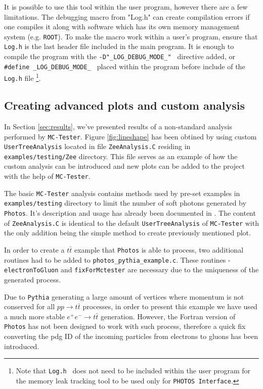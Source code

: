 \documentclass[]{Photos_interface_design}
\begin{document}
It is possible to use this tool within the user program, however there are a few limitations.
The debugging macro from "Log.h" can create compilation errors if one compiles
it along with software which has its own memory management system (e.g. {\tt ROOT}).
To make the macro work within a user's program, ensure that {\tt Log.h} is the last header file
included in the main program.
It is enough to  compile the program with the {\tt -D"\_LOG\_DEBUG\_MODE\_" } directive added,
or {\tt \#define \_LOG\_DEBUG\_MODE\_ } placed within the program before include
of the {\tt Log.h} file%
\footnote{Note that {\tt Log.h } does not need to be included within
the user program  for the memory leak tracking tool to be used only for {\tt PHOTOS Interface}.
}.

\subsection{Creating advanced plots and custom analysis}
\label{App:Plots}

In Section \ref{sec:results}, we've presented results of a non-standard
analysis performed by {\tt MC-Tester}. Figure \ref{fig:lineshape} has been
obtined by using custom {\tt UserTreeAnalysis} located in file {\tt ZeeAnalysis.C}
residing in {\tt examples/testing/Zee} directory. This file serves as an
example of how the custom analysis can be introduced and new plots can be
added to the project with the help of {\tt MC-Tester}.

The basic {\tt MC-Tester} analysis contains methods used by pre-set examples
in {\tt examples/testing} directory to limit the number of soft photons generated
by {\tt Photos}. It's description and usage has already been documented in \cite{??}.
The content of {\tt ZeeAnalysis.C} is identical to the default {\tt UserTreeAnalysis}
of {\tt MC-Tester} with the only addition being the simple method to create
previously mentioned plot.

In order to create a $t \bar t$ example that {\tt Photos} is able to process,
two additional routines had to be added to {\tt photos\_pythia\_example.c}.
These routines - {\tt electronToGluon} and {\tt fixForMctester} are necessary
due to the uniqueness of the generated process.

Due to {\tt Pythia} generating a large amount of vertices where momentum is not
conserved for all $p p \rightarrow t \bar t$ processes, in order to present this
example we have used a much more stable $e^+ e^- \rightarrow t \bar t$
generation. However, the Fortran version of {\tt Photos} has not been designed
to work with such process, therefore a quick fix converting the pdg ID of
the incoming particles from electrons to gluons has been introduced.
\end{document}
